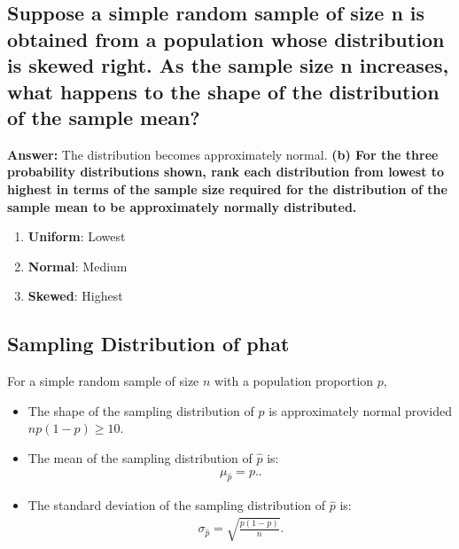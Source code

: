 \documentclass{report}
\begin{document}
     \smallbreak
     \subsection*{Suppose a simple random sample of size n is obtained from a population whose distribution is skewed right. As the sample size n increases, what happens to the shape of the distribution of the sample mean?}
     \bigbreak \noindent 
     \textbf{Answer:} The distribution becomes approximately normal.
     \bigbreak \noindent 
     \textbf{​(b) For the three probability distributions​ shown, rank each distribution from lowest to highest in terms of the sample size required for the distribution of the sample mean to be approximately normally distributed. }
     \begin{enumerate}
       \item \textbf{Uniform}: Lowest
        \item \textbf{Normal}: Medium
        \item \textbf{Skewed}: Highest
     \end{enumerate}

     \bigbreak \noindent \bigbreak \noindent 
     \subsection*{Sampling Distribution of phat}
     \bigbreak \noindent 
             For a simple random sample of size $n$ with a population proportion $p$, 
        \begin{itemize}
            \item The shape of the sampling distribution of $\hat{p}$ is approximately normal provided $np(1-p) \geq 10$.
            \item The mean of the sampling distribution of $\hat{p}$ is:
                \begin{align*}
                    \mu_{\hat{p}} = p.
                .\end{align*}
            \item The standard deviation of the sampling distribution of $\hat{p}$ is:
                \begin{align*}
                    \sigma_{\hat{p}} = \sqrt{\frac{p(1-p)}{n}}
                .\end{align*}
        \end{itemize}
        \bigbreak \noindent 
\end{document}
